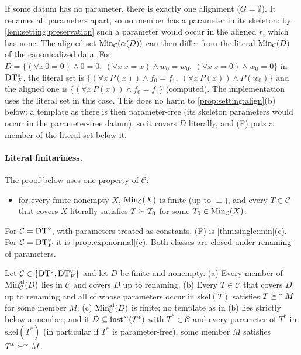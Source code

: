 If some datum has no parameter, there is exactly one alignment ($G=\emptyset$). It renames all parameters apart, so no member has a parameter in its skeleton: by \cref{lem:setting:preservation} such a parameter would occur in the aligned $r$, which has none. The aligned set $\mathrm{Min}_{\mathcal C}(\alpha(D))$ can then differ from the literal $\mathrm{Min}_{\mathcal C}(D)$ of the canonicalized data. For $D=\{(\forall x\,0{=}0)\wedge0{=}0,\ (\forall x\,x{=}x)\wedge w_0{=}w_0,\ (\forall x\,x{=}0)\wedge w_0{=}0\}$ in $\mathrm{DT}^{\circ}_{F}$, the literal set is $\{(\forall x\,P(x))\wedge f_0{=}f_1,\ (\forall x\,P(x))\wedge P(w_0)\}$ and the aligned one is $\{(\forall x\,P(x))\wedge f_0{=}f_1\}$ (computed). The implementation uses the literal set in this case. This does no harm to \cref{prop:setting:align}(b) below: a template as there is then parameter-free (its skeleton parameters would occur in the parameter-free datum), so it covers $D$ literally, and (F) puts a member of the literal set below it.

\paragraph{Literal finitariness.}
The proof below uses one property of $\mathcal C$:
\begin{itemize}
\item[(F)] for every finite nonempty $X$, $\mathrm{Min}_{\mathcal C}(X)$ is finite (up to $\equiv$), and every $T\in\mathcal C$ that covers $X$ literally satisfies $T\succeq T_0$ for some $T_0\in\mathrm{Min}_{\mathcal C}(X)$.
\end{itemize}
For $\mathcal C=\mathrm{DT}^{\circ}$, with parameters treated as constants, (F) is \cref{thm:single:min}(c). For $\mathcal C=\mathrm{DT}^{\circ}_{F}$ it is \cref{prop:exp:normal}(c). Both classes are closed under renaming of parameters.

\begin{proposition}\label{prop:setting:align}
Let $\mathcal C\in\{\mathrm{DT}^{\circ},\mathrm{DT}^{\circ}_{F}\}$ and let $D$ be finite and nonempty.
\textup{(a)} Every member of $\mathrm{Min}^{\mathrm{al}}_{\mathcal C}(D)$ lies in $\mathcal C$ and covers $D$ up to renaming.
\textup{(b)} Every $T\in\mathcal C$ that covers $D$ up to renaming and all of whose parameters occur in $\mathrm{skel}(T)$ satisfies $T\succeq^{\sim}M$ for some member $M$.
\textup{(c)} $\mathrm{Min}^{\mathrm{al}}_{\mathcal C}(D)$ is finite; no template as in (b) lies strictly below a member; and if $D\subseteq\mathrm{inst}^{\sim}(T^*)$ with $T^*\in\mathcal C$ and every parameter of $T^*$ in $\mathrm{skel}(T^*)$ (in particular if $T^*$ is parameter-free), some member $M$ satisfies $T^*\succeq^{\sim}M$.
\end{proposition}

